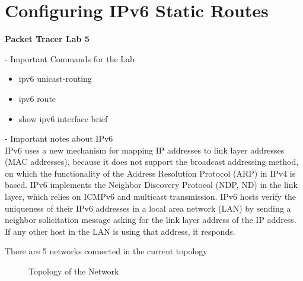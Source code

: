 \documentclass[../EngineeringJournal_CDavis.tex]{subfiles}
\begin{document}

\chapter[Configuring IPv6 Static Routes]{Configuring IPv6 \linebreak[1] Static Routes \hspace*{\fill}{Feb 6, 2020}}
\noindent\textbf{{Packet Tracer Lab 5} }                             

\hspace{0.2cm}
\begin{tcolorbox}[width=6.3in]
\scriptsize 
- Important Commands for the Lab
  \begin{itemize}
    \item{ipv6 unicast-routing}
    \item{ipv6 route} 
    \item{show ipv6 interface brief} 
  \end{itemize}
\normalsize
- Important notes about IPv6
\scriptsize
\\IPv6 uses a new mechanism for mapping IP addresses to link layer addresses 
(MAC addresses), because it does not support the broadcast addressing method, 
on which the functionality of the Address Resolution Protocol (ARP) in IPv4 is based. 
IPv6 implements the Neighbor Discovery Protocol (NDP, ND) in the link layer, 
which relies on ICMPv6 and multicast transmission. IPv6 hosts verify the 
uniqueness of their IPv6 addresses in a local area network (LAN) 
by sending a neighbor solicitation message asking for the link layer 
address of the IP address. If any other host in the LAN is 
using that address, it responds.
\normalsize
\end{tcolorbox}
\hspace{0.2cm}

\newpage

There are 5 networks connected in the current topology

\begin{figure}[!hbt]
  \centering
  \caption{Topology of the Network}
  \label{Top5}
\end{figure}
\end{document}
